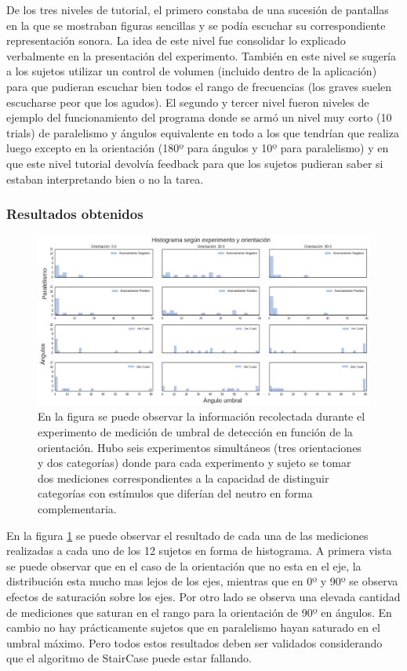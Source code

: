 \documentclass{article}
\begin{document}
    De los tres niveles de tutorial, el primero constaba de una sucesión de pantallas en la que se mostraban figuras sencillas y se podía escuchar su correspondiente representación sonora. La idea de este nivel fue consolidar lo explicado verbalmente en la presentación del experimento. También en este nivel se sugería a los sujetos utilizar un control de volumen (incluido dentro de la aplicación) para que pudieran escuchar bien todos el rango de frecuencias (los graves suelen escucharse peor que los agudos). El segundo y tercer nivel fueron niveles de ejemplo del funcionamiento del programa donde se armó un nivel muy corto (10 trials) de paralelismo y ángulos equivalente en todo a los que tendrían que realiza luego excepto en la orientación (180º para ángulos y 10º para paralelismo) y en que este nivel tutorial devolvía feedback para que los sujetos pudieran saber si estaban interpretando bien o no la tarea. 
    
    \subsubsection{Resultados obtenidos}
    
    \begin{figure}
        \center
        \includegraphics[width=\textwidth]{Imagenes/Exp1_DataCruda.png}
        \caption{En la figura se puede observar la información recolectada durante el experimento de medición de umbral de detección en función de la orientación. Hubo seis experimentos simultáneos (tres orientaciones y dos categorías) donde para cada experimento y sujeto se tomar dos mediciones correspondientes a la capacidad de distinguir categorías con estímulos que diferían del neutro en forma complementaria.}
        \label{fig:Exp1DataCruda}
    \end{figure}  
    
    En la figura \ref{fig:Exp1DataCruda} se puede observar el resultado de cada una de las mediciones realizadas a cada uno de los 12 sujetos en forma de histograma. A primera vista se puede observar que en el caso de la orientación que no esta en el eje, la distribución esta mucho mas lejos de los ejes, mientras que en 0º y 90º se observa efectos de saturación sobre los ejes. Por otro lado se observa una elevada cantidad de mediciones que saturan en el rango para la orientación de 90º en ángulos. En cambio no hay prácticamente sujetos que en paralelismo hayan saturado en el umbral máximo. Pero todos estos resultados deben ser validados considerando que el algoritmo de StairCase puede estar fallando. 
    
\end{document}
